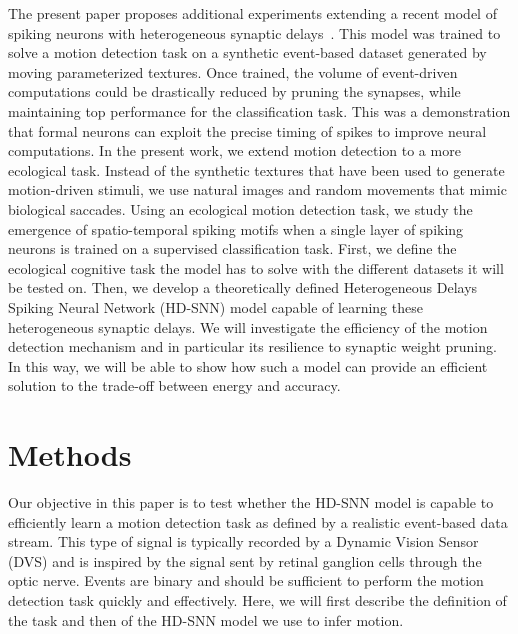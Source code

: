 \documentclass[default]{sn-jnl}%
\theoremstyle{thmstyleone}%
\theoremstyle{thmstyletwo}%
\theoremstyle{thmstylethree}%
\begin{document}
The present paper proposes additional experiments extending a recent model of spiking neurons with heterogeneous synaptic delays~\cite{grimaldi_learning_2022}. This model was trained to solve a motion detection task on a synthetic event-based dataset generated by moving parameterized textures. Once trained, the volume of event-driven computations could be drastically reduced by pruning the synapses, while maintaining top performance for the classification task. This was a demonstration that formal neurons can exploit the precise timing of spikes to improve neural computations. In the present work, we extend motion detection to a more ecological task. Instead of the synthetic textures that have been used to generate motion-driven stimuli, we use natural images and random movements that mimic biological saccades. Using an ecological motion detection task, we study the emergence of spatio-temporal spiking motifs when a single layer of spiking neurons is trained on a supervised classification task. First, we define the ecological cognitive task the model has to solve with the different datasets it will be tested on. Then, we develop a theoretically defined Heterogeneous Delays Spiking Neural Network (HD-SNN) model capable of learning these heterogeneous synaptic delays. We will investigate the efficiency of the motion detection mechanism and in particular its resilience to synaptic weight pruning. In this way, we will be able to show how such a model can provide an efficient solution to the trade-off between energy and accuracy.
%
\section{Methods}
\label{sec:methods}
Our objective in this paper is to test whether the HD-SNN model is capable to efficiently learn a motion detection task as defined by a realistic event-based data stream. This type of signal is typically recorded by a Dynamic Vision Sensor (DVS) and is inspired by the signal sent by retinal ganglion cells through the optic nerve. Events are binary and should be sufficient to perform the motion detection task quickly and effectively. Here, we will first describe the definition of the task and then of the HD-SNN model we use to infer motion. 
%
\end{document}
